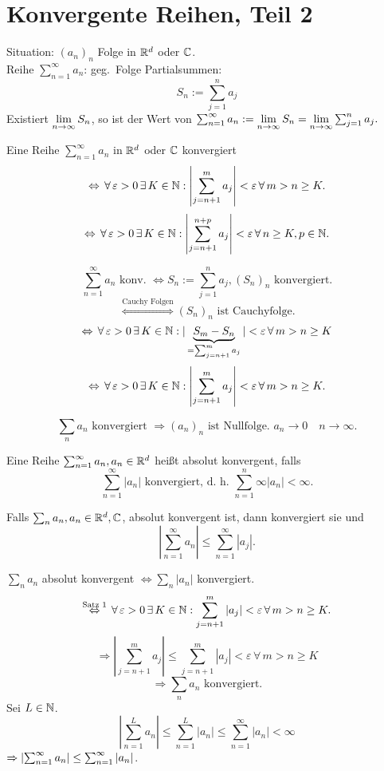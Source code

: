 \documentclass[../ana1.tex]{subfiles}
\begin{document}
\setcounter{section}{12}

\section{Konvergente Reihen, Teil 2}
Situation: \( {(a_n)}_n \) Folge in \( \mathbb{R}^d \) oder \( \mathbb{C} \).\\
Reihe \( \sum_{n=1}^\infty a_n \): geg.\ Folge Partialsummen:
\[ S_n := \sum_{j=1}^n a_j \]
Existiert \( \lim\limits_{n\rightarrow\infty} S_n \), so ist der Wert von \( \sum_{n=1}^\infty a_n := \lim\limits_{n\rightarrow\infty} S_n = \lim\limits_{n\rightarrow\infty} \sum_{j=1}^n a_j. \)
\begin{satz}[Cauchykriterium]
    Eine Reihe \( \sum_{n=1}^\infty a_n \) in \( \mathbb{R}^d \) oder \( \mathbb{C} \) konvergiert
    \[ \Leftrightarrow \, \forall \, \varepsilon > 0 \,\exists \, K\in\mathbb{N}: \left| \sum_{j=n+1}^m a_j \right| < \varepsilon \,\forall \, m>n\geq K. \]
    \[ \Leftrightarrow \, \forall \, \varepsilon > 0 \,\exists \, K\in\mathbb{N}: \left| \sum_{j=n+1}^{n+p} a_j \right| < \varepsilon \,\forall \, n\geq K, p\in\mathbb{N}. \]
\end{satz}
\begin{bew}
    \[ \sum_{n=1}^\infty a_n \text{ konv. } \Leftrightarrow S_n := \sum_{j=1}^n a_j, {(S_n)}_n \text{ konvergiert.} \]
    \[ \overset{\text{Cauchy Folgen}}{\Leftrightarrow} {(S_n)}_n \text{ ist Cauchyfolge.} \]
    \[ \Leftrightarrow \,\forall \, \varepsilon > 0 \,\exists \, K\in\mathbb{N}: |\underbrace{S_m - S_n}_{=\sum_{j=n+1}^m a_j}| < \varepsilon \,\forall \, m>n\geq K \]
    \[ \Leftrightarrow \,\forall \, \varepsilon > 0 \,\exists \, K\in\mathbb{N}: \left| \sum_{j=n+1}^m a_j \right| < \varepsilon \,\forall \, m>n\geq K. \]
\end{bew}
\begin{bem}
    \[ \sum_n a_n \text{ konvergiert } \Rightarrow {(a_n)}_n \text{ ist Nullfolge. } a_n \rightarrow 0 \quad n\rightarrow \infty. \]
\end{bem}
\begin{defi}
    Eine Reihe \( \sum_{n=1}^\infty a_n, a_n\in\mathbb{R}^d \) heißt absolut konvergent, falls
    \[ \sum_{n=1}^\infty |a_n| \text{ konvergiert, d.\ h.\ } \sum_{n=1}^n\infty |a_n| < \infty. \]
\end{defi}
\begin{satz}
    Falls \( \sum_n a_n, a_n\in\mathbb{R}^d,\mathbb{C} \), absolut konvergent ist, dann konvergiert sie und
    \[ \left| \sum_{n=1}^\infty a_n \right| \leq \sum_{n=1}^\infty |a_j|. \]
\end{satz}
\begin{bew}
    \( \sum_n a_n \) absolut konvergent \( \Leftrightarrow \sum_n |a_n| \) konvergiert.
    \[ \overset{\text{Satz 1}}{\Leftrightarrow} \,\forall \, \varepsilon > 0 \,\exists \, K\in\mathbb{N}: \sum_{j=n+1}^m |a_j| < \varepsilon \,\forall \, m>n\geq K. \]
    \[ \Rightarrow \left| \sum_{j=n+1}^m a_j \right| \leq \sum_{j=n+1}^m |a_j| < \varepsilon \,\forall \, m>n\geq K \]
    \[ \Rightarrow \sum_n a_n \text{ konvergiert.} \]
    Sei \( L \in\mathbb{N} \). 
    \[ \left| \sum_{n=1}^L a_n \right| \leq \sum_{n=1}^L |a_n| \leq \sum_{n=1}^\infty |a_n| < \infty \]
    \( \Rightarrow \left|\sum_{n=1}^\infty a_n\right| \leq \sum_{n=1}^\infty \left|a_n\right| \).
\end{bew}
\end{document}

